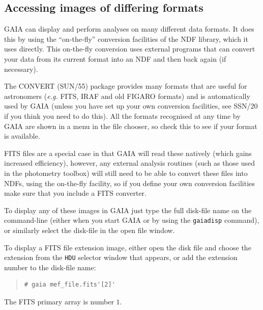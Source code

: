 \documentclass[twoside,11pt]{article}
\newcommand{\xref}[3]{#1}
\newcommand{\xlabel}[1]{}
\renewcommand{\_}{\texttt{\symbol{95}}}
\newcommand{\mytt}[1]{{\texttt{#1}}}
\begin{document}
\subsection{\xlabel{image_formats}Accessing images of differing formats}

GAIA can display and perform analyses on many different data
formats. It does this by using the ``on-the-fly'' conversion
facilities of the NDF library, which it uses directly. This on-the-fly
conversion uses external programs that can convert your data from its
current format into an NDF and then back again (if necessary).

The CONVERT \xref{(SUN/55)}{sun55}{} package provides many formats
that are useful for astronomers (\textit{e.g.} FITS, IRAF and old FIGARO
formats) and is automatically used by GAIA (unless you have set up
your own conversion facilities, see \xref{SSN/20}{ssn20}{} if you
think you need to do this). All the formats recognised at any time by
GAIA are shown in a menu in the file chooser, so check this to see
if your format is available.

FITS files are a special case in that GAIA will read these natively
(which gains increased efficiency), however, any external analysis
routines (such as those used in the photometry toolbox) will still
need to be able to convert these files into NDFs, using the on-the-fly
facility, so if you define your own conversion facilities make sure
that you include a FITS converter.

To display any of these images in GAIA just type the full disk-file
name on the command-line (either when you start GAIA or by using the
\mytt{gaiadisp} command), or similarly select the disk-file in the
open file window. 

To display a FITS file extension image, either open the disk file and
choose the extension from the \mytt{HDU} selector window that appears,
or add the extension number to the disk-file name:
\begin{quote}
\begin{verbatim}
# gaia mef_file.fits'[2]'
\end{verbatim}
\end{quote}
The FITS primary array is number $1$.
\end{document}
